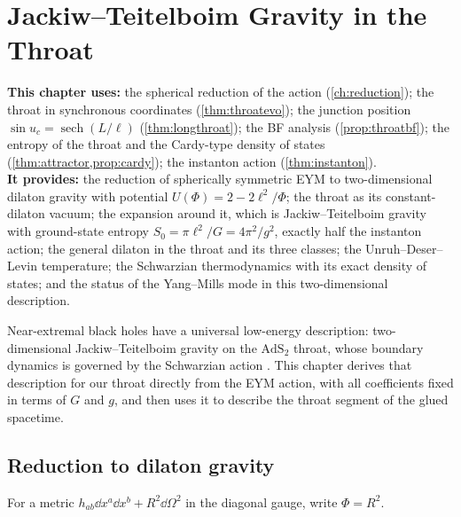 \chapter{Jackiw--Teitelboim Gravity in the Throat}
\label{ch:jt}

\begin{usesbox}
\textbf{This chapter uses:} the spherical reduction of the action (\cref{ch:reduction}); the throat in synchronous coordinates (\cref{thm:throatevo}); the junction position $\sin u_c=\operatorname{sech}(L/\ell)$ (\cref{thm:longthroat}); the BF analysis (\cref{prop:throatbf}); the entropy of the throat and the Cardy-type density of states (\cref{thm:attractor,prop:cardy}); the instanton action (\cref{thm:instanton}).\\
\textbf{It provides:} the reduction of spherically symmetric EYM to two-dimensional dilaton gravity with potential $U(\Phi)=2-2\ell^2/\Phi$; the throat as its constant-dilaton vacuum; the expansion around it, which is Jackiw--Teitelboim gravity with ground-state entropy $S_0=\pi\ell^2/G=4\pi^2/g^2$, exactly half the instanton action; the general dilaton in the throat and its three classes; the Unruh--Deser--Levin temperature; the Schwarzian thermodynamics with its exact density of states; and the status of the Yang--Mills mode in this two-dimensional description.
\end{usesbox}

Near-extremal black holes have a universal low-energy description: two-dimensional Jackiw--Teitelboim gravity on the $\mathrm{AdS}_2$ throat, whose boundary dynamics is governed by the Schwarzian action \cite{AlmheiriPolchinski2015,MaldacenaStanfordYang2016}. This chapter derives that description for our throat directly from the EYM action, with all coefficients fixed in terms of $G$ and $g$, and then uses it to describe the throat segment of the glued spacetime.

\section{Reduction to dilaton gravity}

For a metric $h_{ab}\dd x^a\dd x^b+R^2\dd\Omega^2$ in the diagonal gauge, write $\Phi=R^2$.

